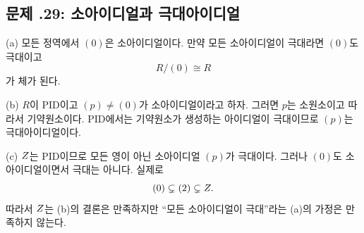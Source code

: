 \subsection*{문제 \thechapter.29: 소아이디얼과 극대아이디얼}

\begin{solution}
(a) 모든 정역에서 $(0)$은 소아이디얼이다. 만약 모든 소아이디얼이 극대라면 $(0)$도 극대이고
\[
  R/(0)\cong R
\]
가 체가 된다.

(b) $R$이 PID이고 $(p)\ne(0)$가 소아이디얼이라고 하자. 그러면 $p$는 소원소이고 따라서 기약원소이다. PID에서는 기약원소가 생성하는 아이디얼이 극대이므로 $(p)$는 극대아이디얼이다.

(c) $Z$는 PID이므로 모든 영이 아닌 소아이디얼 $(p)$가 극대이다. 그러나 $(0)$도 소아이디얼이면서 극대는 아니다. 실제로
\[
  (0)\subsetneq(2)\subsetneq Z.
\]
따라서 $Z$는 (b)의 결론은 만족하지만 ``모든 소아이디얼이 극대''라는 (a)의 가정은 만족하지 않는다.
\end{solution}
